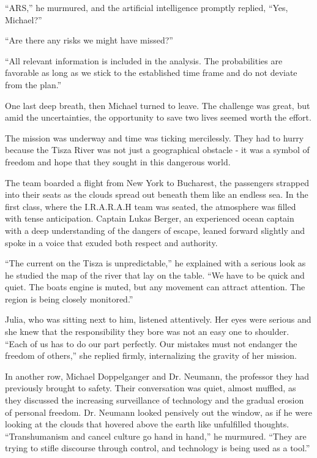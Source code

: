 \documentclass[
]{article}
\begin{document}
``ARS,'' he murmured, and the artificial intelligence promptly replied,
``Yes, Michael?''

``Are there any risks we might have missed?''

``All relevant information is included in the analysis. The
probabilities are favorable as long as we stick to the established time
frame and do not deviate from the plan.''

One last deep breath, then Michael turned to leave. The challenge was
great, but amid the uncertainties, the opportunity to save two lives
seemed worth the effort.

The mission was underway and time was ticking mercilessly. They had to
hurry because the Tisza River was not just a geographical obstacle - it
was a symbol of freedom and hope that they sought in this dangerous
world.

The team boarded a flight from New York to Bucharest, the passengers
strapped into their seats as the clouds spread out beneath them like an
endless sea. In the first class, where the I.R.A.R.A.H team was seated,
the atmosphere was filled with tense anticipation. Captain Lukas Berger,
an experienced ocean captain with a deep understanding of the dangers of
escape, leaned forward slightly and spoke in a voice that exuded both
respect and authority.

``The current on the Tisza is unpredictable,'' he explained with a
serious look as he studied the map of the river that lay on the table.
``We have to be quick and quiet. The boat\textquotesingle s engine is
muted, but any movement can attract attention. The region is being
closely monitored.''

Julia, who was sitting next to him, listened attentively. Her eyes were
serious and she knew that the responsibility they bore was not an easy
one to shoulder. ``Each of us has to do our part perfectly. Our mistakes
must not endanger the freedom of others,'' she replied firmly,
internalizing the gravity of her mission.

In another row, Michael Doppelganger and Dr. Neumann, the professor they
had previously brought to safety. Their conversation was quiet, almost
muffled, as they discussed the increasing surveillance of technology and
the gradual erosion of personal freedom. Dr. Neumann looked pensively
out the window, as if he were looking at the clouds that hovered above
the earth like unfulfilled thoughts. ``Transhumanism and cancel culture
go hand in hand,'' he murmured. ``They are trying to stifle discourse
through control, and technology is being used as a tool.''
\end{document}
